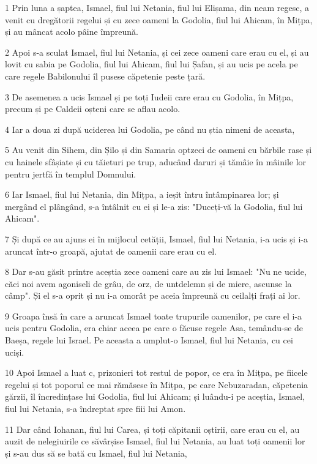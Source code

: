 \par 1 Prin luna a șaptea, Ismael, fiul lui Netania, fiul lui Elișama, din neam regesc, a venit cu dregătorii regelui și cu zece oameni la Godolia, fiul lui Ahicam, în Mițpa, și au mâncat acolo pâine împreună.
\par 2 Apoi s-a sculat Ismael, fiul lui Netania, și cei zece oameni care erau cu el, și au lovit cu sabia pe Godolia, fiul lui Ahicam, fiul lui Șafan, și au ucis pe acela pe care regele Babilonului îl pusese căpetenie peste țară.
\par 3 De asemenea a ucis Ismael și pe toți Iudeii care erau cu Godolia, în Mițpa, precum și pe Caldeii oșteni care se aflau acolo.
\par 4 Iar a doua zi după uciderea lui Godolia, pe când nu știa nimeni de aceasta,
\par 5 Au venit din Sihem, din Șilo și din Samaria optzeci de oameni cu bărbile rase și cu hainele sfâșiate și cu tăieturi pe trup, aducând daruri și tămâie în mâinile lor pentru jertfă în templul Domnului.
\par 6 Iar Ismael, fiul lui Netania, din Mițpa, a ieșit întru întâmpinarea lor; și mergând el plângând, s-a întâlnit cu ei și le-a zis: "Duceți-vă la Godolia, fiul lui Ahicam".
\par 7 Și după ce au ajuns ei în mijlocul cetății, Ismael, fiul lui Netania, i-a ucis și i-a aruncat într-o groapă, ajutat de oamenii care erau cu el.
\par 8 Dar s-au găsit printre aceștia zece oameni care au zis lui Ismael: "Nu ne ucide, căci noi avem agoniseli de grâu, de orz, de untdelemn și de miere, ascunse la câmp". Și el s-a oprit și nu i-a omorât pe aceia împreună cu ceilalți frați ai lor.
\par 9 Groapa însă în care a aruncat Ismael toate trupurile oamenilor, pe care el i-a ucis pentru Godolia, era chiar aceea pe care o făcuse regele Asa, temându-se de Baeșa, regele lui Israel. Pe aceasta a umplut-o Ismael, fiul lui Netania, cu cei uciși.
\par 10 Apoi Ismael a luat c, prizonieri tot restul de popor, ce era în Mițpa, pe fiicele regelui și tot poporul ce mai rămăsese în Mițpa, pe care Nebuzaradan, căpetenia gărzii, îl încredințase lui Godolia, fiul lui Ahicam; și luându-i pe aceștia, Ismael, fiul lui Netania, s-a îndreptat spre fiii lui Amon.
\par 11 Dar când Iohanan, fiul lui Carea, și toți căpitanii oștirii, care erau cu el, au auzit de nelegiuirile ce săvârșise Ismael, fiul lui Netania, au luat toți oamenii lor și s-au dus să se bată cu Ismael, fiul lui Netania,
